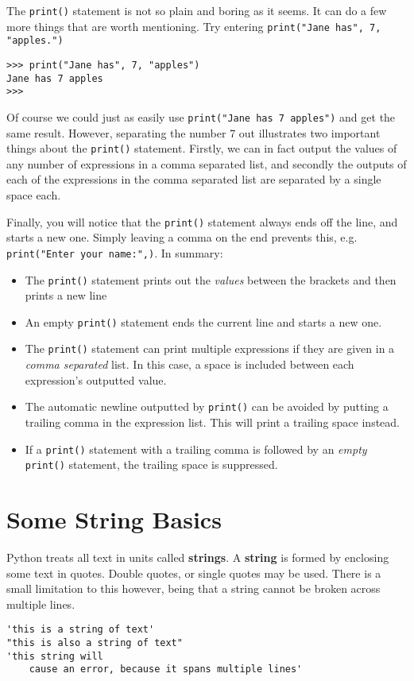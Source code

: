 The \texttt{print()} statement is not so plain and boring as it seems. It can   do a few more things that are worth mentioning. Try entering 
\texttt{print("Jane     has", 7, "apples.")}
\begin{lstlisting}
>>> print("Jane has", 7, "apples")
Jane has 7 apples
>>>
\end{lstlisting}

Of course we could just as easily use 
\texttt{print("Jane has 7   apples")} and get the same result. However, separating the number   7 out illustrates two important things about the \texttt{print()} statement.   Firstly, we can in fact output the values of any number of expressions   in a comma separated list, and secondly the outputs of each of the   expressions in the comma separated list are separated by a single space   each.

Finally, you will notice that the \texttt{print()} statement always ends off   the line, and starts a new one. Simply leaving a comma on the end   prevents this, e.g. 
\texttt{print("Enter your name:",)}. In summary:
\begin{itemize}
	\item The \texttt{print()} statement prints out the \textit{values}  between the     brackets and then prints a new line
	\item An empty \texttt{print()} statement ends the current line and starts a new     one.
	\item The \texttt{print()} statement can print multiple expressions if they are     given in a \textit{comma separated} list. In this case, a space is     included between each expression's outputted value.
	\item The automatic newline outputted by \texttt{print()} can be avoided by     putting a trailing comma in the expression list. This will print a     trailing space instead.
	\item If a \texttt{print()} statement with a trailing comma is followed by an     \textit{empty} \texttt{print()} statement, the trailing space is     suppressed.
\end{itemize}

\section{Some String Basics}

Python treats all text in units called \textbf{strings}. A \textbf{string} is formed   by enclosing some text in quotes. Double quotes, or single quotes may   be used. There is a small limitation to this however, being that a   string cannot be broken across multiple lines.
\begin{lstlisting}
'this is a string of text'
"this is also a string of text"
'this string will
    cause an error, because it spans multiple lines'
\end{lstlisting}


